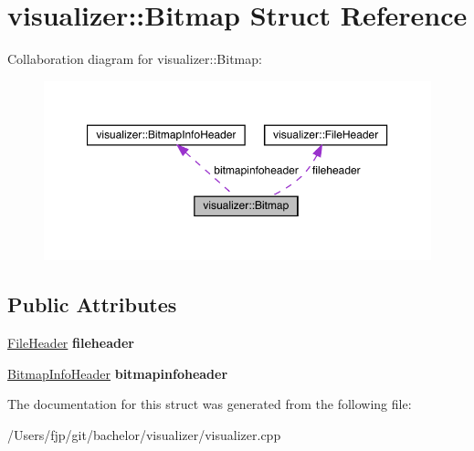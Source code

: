 \hypertarget{structvisualizer_1_1_bitmap}{}\section{visualizer\+:\+:Bitmap Struct Reference}
\label{structvisualizer_1_1_bitmap}


Collaboration diagram for visualizer\+:\+:Bitmap\+:\nopagebreak
\begin{figure}[H]
\begin{center}
\leavevmode
\includegraphics[width=350pt]{structvisualizer_1_1_bitmap__coll__graph}
\end{center}
\end{figure}
\subsection*{Public Attributes}
\begin{DoxyCompactItemize}
\item 
\mbox{\label{structvisualizer_1_1_bitmap_a35cd50ab96ca92a2f3cc92fbec0ccef0}} 
\mbox{\hyperlink{structvisualizer_1_1_file_header}{File\+Header}} {\bfseries fileheader}
\item 
\mbox{\label{structvisualizer_1_1_bitmap_ae321d14404bf8daff08333b6b2858603}} 
\mbox{\hyperlink{structvisualizer_1_1_bitmap_info_header}{Bitmap\+Info\+Header}} {\bfseries bitmapinfoheader}
\end{DoxyCompactItemize}


The documentation for this struct was generated from the following file\+:\begin{DoxyCompactItemize}
\item 
/\+Users/fjp/git/bachelor/visualizer/visualizer.\+cpp\end{DoxyCompactItemize}
